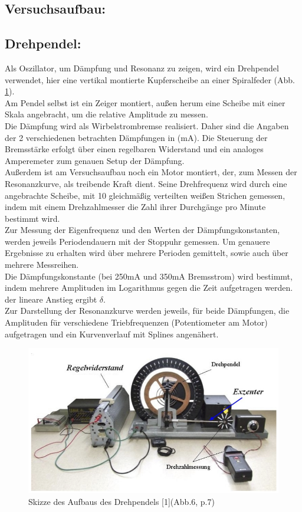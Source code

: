 \documentclass[12pt,a4paper]{article}
\begin{document}
\begin{multicols}{2}
\section{Versuchsaufbau:}
\subsection{Drehpendel:}
Als Oszillator, um Dämpfung und Resonanz zu zeigen, wird ein Drehpendel verwendet, hier eine vertikal montierte Kupferscheibe an einer Spiralfeder (Abb. \ref{fig:drehpendel_skizze}).\\
Am Pendel selbst ist ein Zeiger montiert, außen herum eine Scheibe mit einer Skala angebracht, um die relative Amplitude zu messen.\\
Die Dämpfung wird als Wirbelstrombremse realisiert. Daher sind die Angaben der 2 verschiedenen betrachten Dämpfungen in (mA). Die Steuerung der Bremsstärke erfolgt über einen regelbaren Widerstand und ein analoges Amperemeter zum genauen Setup der Dämpfung.\\
Außerdem ist am Versuchsaufbau noch ein Motor montiert, der, zum Messen der Resonanzkurve, als treibende Kraft dient. Seine Drehfrequenz wird durch eine angebrachte Scheibe, mit 10 gleichmäßig verteilten weißen Strichen gemessen, indem mit einem Drehzahlmesser die Zahl ihrer Durchgänge pro Minute bestimmt wird.\\

Zur Messung der Eigenfrequenz und den Werten der Dämpfungskonstanten, werden jeweils Periodendauern mit der Stoppuhr gemessen. Um genauere Ergebnisse zu erhalten wird über mehrere Perioden gemittelt, sowie auch über mehrere Messreihen.\\
Die Dämpfungskonstante (bei 250mA und 350mA Bremsstrom) wird bestimmt, indem mehrere Amplituden im Logarithmus gegen die Zeit aufgetragen werden. der lineare Anstieg ergibt $\delta$.\\
Zur Darstellung der Resonanzkurve werden jeweils, für beide Dämpfungen, die Amplituden für verschiedene Triebfrequenzen (Potentiometer am Motor) aufgetragen und ein Kurvenverlauf mit Splines angenähert.
\begin{figure}[H]
	\centering
	\includegraphics[scale=0.4]{./figure/Drehpendel.png}
	\caption{Skizze des Aufbaus des Drehpendels [1](Abb.6, p.7)}
	\label{fig:drehpendel_skizze}
\end{figure}

\end{multicols}
\end{document}
